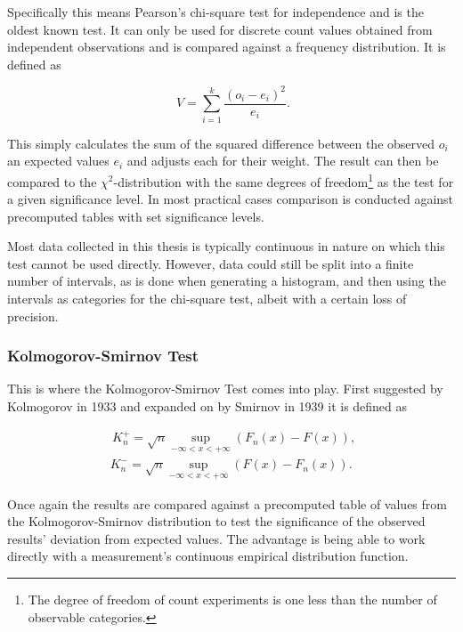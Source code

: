 Specifically this means Pearson's chi-square test for independence\cite{doi:10.1080/14786440009463897} and is the oldest known test. It can only be used for discrete count values obtained from independent observations and is compared against a frequency distribution. It is defined as

\begin{equation}
\phantom{.}V=\sum_{i=1}^{k} \frac{(o_i - e_i)^2}{e_i}\text{.}
\end{equation}

This simply calculates the sum of the squared difference between the observed $o_i$ an expected values $e_i$ and adjusts each for their weight. The result can then be compared to the $\chi^2$-distribution with the same degrees of freedom\footnote{The degree of freedom of count experiments is one less than the number of observable categories.} as the test for a given significance level. In most practical cases comparison is conducted against precomputed tables with set significance levels.

Most data collected in this thesis is typically continuous in nature on which this test cannot be used directly. However, data could still be split into a finite number of intervals, as is done when generating a histogram, and then using the intervals as categories for the chi-square test, albeit with a certain loss of precision.


\subsubsection{Kolmogorov-Smirnov Test}

This is where the Kolmogorov-Smirnov Test comes into play. First suggested by Kolmogorov in 1933 \cite{kolmogorov1933sulla} and expanded on by Smirnov in 1939 \cite{smirnov1939estimation} it is defined as

\begin{equation}
	\begin{aligned}
	\phantom{,}K_n^+ = \sqrt{n} \sup_{-\infty < x < + \infty} \left( F_n(x) - F(x) \right), \\
	\phantom{.}K_n^- = \sqrt{n} \sup_{-\infty < x < + \infty} \left( F(x) - F_n(x) \right).
	\end{aligned}
\end{equation}

Once again the results are compared against a precomputed table of values from the Kolmogorov-Smirnov distribution to test the significance of the observed results' deviation from expected values. The advantage is being able to work directly with a measurement's continuous empirical distribution function.

